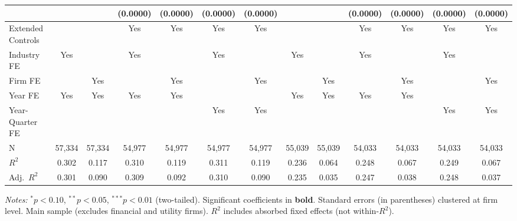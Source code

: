 \begin{landscape}
\begin{table}[H]
\begin{tabular}{lcccccccccccc}
 &  &  & (0.0000) & (0.0000) & (0.0000) & (0.0000) &  &  & (0.0000) & (0.0000) & (0.0000) & (0.0000) \\
\midrule
Extended Controls &  &  & Yes & Yes & Yes & Yes &  &  & Yes & Yes & Yes & Yes \\
Industry FE & Yes &  & Yes &  & Yes &  & Yes &  & Yes &  & Yes &  \\
Firm FE &  & Yes &  & Yes &  & Yes &  & Yes &  & Yes &  & Yes \\
Year FE & Yes & Yes & Yes & Yes &  &  & Yes & Yes & Yes & Yes &  &  \\
Year-Quarter FE &  &  &  &  & Yes & Yes &  &  &  &  & Yes & Yes \\
\midrule
N & 57,334 & 57,334 & 54,977 & 54,977 & 54,977 & 54,977 & 55,039 & 55,039 & 54,033 & 54,033 & 54,033 & 54,033 \\
$R^2$ & 0.302 & 0.117 & 0.310 & 0.119 & 0.311 & 0.119 & 0.236 & 0.064 & 0.248 & 0.067 & 0.249 & 0.067 \\
Adj.~$R^2$ & 0.301 & 0.090 & 0.309 & 0.092 & 0.310 & 0.090 & 0.235 & 0.035 & 0.247 & 0.038 & 0.248 & 0.037 \\
\bottomrule
\end{tabular}
\begin{minipage}{\linewidth}
\vspace{2pt}\scriptsize
\textit{Notes:} $^{*}p<0.10$, $^{**}p<0.05$, $^{***}p<0.01$ (two-tailed).
 Significant coefficients in \textbf{bold}.
 Standard errors (in parentheses) clustered at firm level.
 Main sample (excludes financial and utility firms).
 $R^2$ includes absorbed fixed effects (not within-$R^2$).
\end{minipage}
\end{table}
\end{landscape}